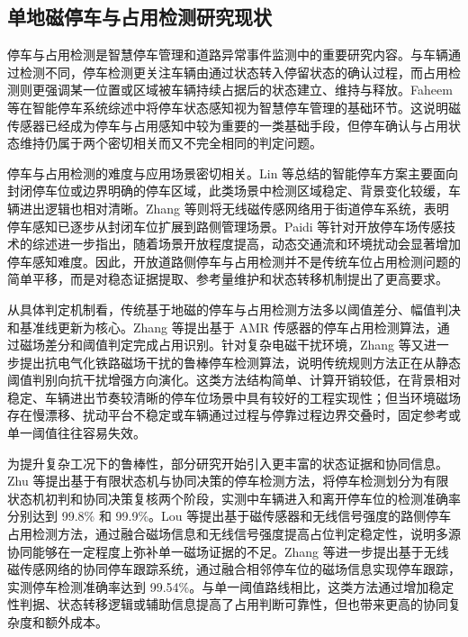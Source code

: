 \documentclass{xdupgthesis}
\begin{document}
\subsection{单地磁停车与占用检测研究现状}
\label{sec:related_parking_detection}

停车与占用检测是智慧停车管理和道路异常事件监测中的重要研究内容。与车辆通过检测不同，停车检测更关注车辆由通过状态转入停留状态的确认过程，而占用检测则更强调某一位置或区域被车辆持续占据后的状态建立、维持与释放。Faheem 等\cite{R49}在智能停车系统综述中将停车状态感知视为智慧停车管理的基础环节。这说明磁传感器已经成为停车与占用感知中较为重要的一类基础手段，但停车确认与占用状态维持仍属于两个密切相关而又不完全相同的判定问题。

停车与占用检测的难度与应用场景密切相关。Lin 等\cite{ch4_lin2017surveyparking}总结的智能停车方案主要面向封闭停车位或边界明确的停车区域，此类场景中检测区域稳定、背景变化较缓，车辆进出逻辑也相对清晰。Zhang 等\cite{ch4_gu2013streetparking}则将无线磁传感网络用于街道停车系统，表明停车感知已逐步从封闭车位扩展到路侧管理场景。Paidi 等\cite{R52}针对开放停车场传感技术的综述进一步指出，随着场景开放程度提高，动态交通流和环境扰动会显著增加停车感知难度。因此，开放道路侧停车与占用检测并不是传统车位占用检测问题的简单平移，而是对稳态证据提取、参考量维护和状态转移机制提出了更高要求。

从具体判定机制看，传统基于地磁的停车与占用检测方法多以阈值差分、幅值判决和基准线更新为核心。Zhang 等\cite{ch4_zhang2015amr}提出基于 AMR 传感器的停车占用检测算法，通过磁场差分和阈值判定完成占用识别。针对复杂电磁干扰环境，Zhang 等\cite{ch4_zhang2020railway}又进一步提出抗电气化铁路磁场干扰的鲁棒停车检测算法，说明传统规则方法正在从静态阈值判别向抗干扰增强方向演化。这类方法结构简单、计算开销较低，在背景相对稳定、车辆进出节奏较清晰的停车位场景中具有较好的工程实现性；但当环境磁场存在慢漂移、扰动平台不稳定或车辆通过过程与停靠过程边界交叠时，固定参考或单一阈值往往容易失效。

为提升复杂工况下的鲁棒性，部分研究开始引入更丰富的状态证据和协同信息。Zhu 等\cite{R47}提出基于有限状态机与协同决策的停车检测方法，将停车检测划分为有限状态机初判和协同决策复核两个阶段，实测中车辆进入和离开停车位的检测准确率分别达到 99.8\% 和 99.9\%。Lou 等\cite{R45}提出基于磁传感器和无线信号强度的路侧停车占用检测方法，通过融合磁场信息和无线信号强度提高占位判定稳定性，说明多源协同能够在一定程度上弥补单一磁场证据的不足。Zhang 等\cite{ch4_zhang2020tracking}进一步提出基于无线磁传感网络的协同停车跟踪系统，通过融合相邻停车位的磁场信息实现停车跟踪，实测停车检测准确率达到 99.54\%。与单一阈值路线相比，这类方法通过增加稳定性判据、状态转移逻辑或辅助信息提高了占用判断可靠性，但也带来更高的协同复杂度和额外成本。
\end{document}
